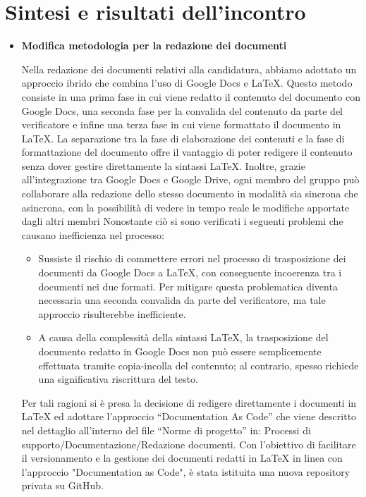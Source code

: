 \documentclass{article}
\begin{document}
\section*{\textbf{Sintesi e risultati dell’incontro}}

\begin{itemize}
  \item \textbf{\fontsize{12}{6}\selectfont Modifica metodologia per la redazione dei documenti}
  
  Nella redazione dei documenti relativi alla candidatura, abbiamo adottato un approccio ibrido che combina l'uso di Google Docs e LaTeX. Questo metodo consiste in una prima fase in cui viene redatto il contenuto del documento con Google Docs, una seconda fase per la convalida del contenuto da parte del verificatore e infine una terza fase in cui viene formattato il documento in LaTeX.
  La separazione tra la fase di elaborazione dei contenuti e la fase di formattazione del documento offre il vantaggio di poter redigere il contenuto senza dover gestire direttamente la sintassi LaTeX. Inoltre, grazie all’integrazione tra Google Docs e Google Drive, ogni membro del gruppo può collaborare alla redazione dello stesso documento in modalità sia sincrona che asincrona, con la possibilità di vedere in tempo reale le modifiche apportate dagli altri membri
  Nonostante ciò si sono verificati i seguenti problemi che causano inefficienza nel processo:
  \begin{itemize}
    \item Sussiste il rischio di commettere errori nel processo di trasposizione dei documenti da Google Docs a LaTeX, con conseguente incoerenza tra i documenti nei due formati. Per mitigare questa problematica diventa necessaria una seconda convalida da parte del verificatore, ma tale approccio risulterebbe inefficiente.
    \item A causa della complessità della sintassi LaTeX, la trasposizione del documento redatto in Google Docs non può essere semplicemente effettuata tramite copia-incolla del contenuto; al contrario, spesso richiede una significativa riscrittura del testo.
  \end{itemize}
  Per tali ragioni si è presa la decisione di redigere direttamente i documenti in LaTeX ed adottare l’approccio “Documentation As Code” che viene descritto nel dettaglio all’interno del file “Norme di progetto” in: Processi di supporto/Documentazione/Redazione documenti. Con l'obiettivo di facilitare il versionamento e la gestione dei documenti redatti in LaTeX in linea con l'approccio "Documentation as Code", è stata istituita una nuova repository privata su GitHub.
    \vspace{0.5cm}
  

\end{itemize}
\end{document}

